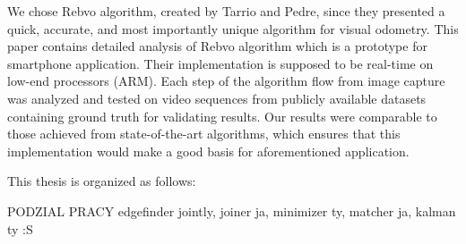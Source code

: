 We chose Rebvo algorithm, created by Tarrio and Pedre, since they presented a quick, accurate, and most importantly unique algorithm for visual odometry. This paper contains detailed analysis of Rebvo algorithm which is a prototype for smartphone application. Their implementation is supposed to be real-time on low-end processors (ARM).
Each step of the algorithm flow from image capture was analyzed and tested on video sequences from publicly available datasets containing ground truth for validating results. Our results were comparable to those achieved from state-of-the-art algorithms, which ensures that this implementation would make a good basis for aforementioned application.

This thesis is organized as follows:

PODZIAL PRACY
 edgefinder jointly, joiner ja, minimizer ty, matcher ja, kalman ty :S



\clearpage 